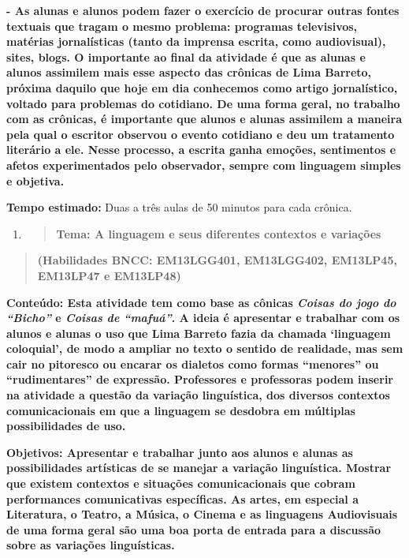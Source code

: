 \textbf{- As alunas e alunos podem fazer o exercício de procurar outras
fontes textuais que tragam o mesmo problema: programas televisivos,
matérias jornalísticas (tanto da imprensa escrita, como audiovisual),
sites, blogs. O importante ao final da atividade é que as alunas e
alunos assimilem mais esse aspecto das crônicas de Lima Barreto, próxima
daquilo que hoje em dia conhecemos como artigo jornalístico, voltado
para problemas do cotidiano. De uma forma geral, no trabalho com as
crônicas, é importante que alunos e alunas assimilem a maneira pela qual
o escritor observou o evento cotidiano e deu um tratamento literário a
ele. Nesse processo, a escrita ganha emoções, sentimentos e afetos
experimentados pelo observador, sempre com linguagem simples e objetiva.
}

\textbf{Tempo estimado:} Duas a três aulas de 50 minutos para cada
crônica.

\begin{enumerate}
\def\labelenumi{\arabic{enumi})}
\setcounter{enumi}{1}
\item
  \begin{quote}
  \textbf{Tema: A linguagem e seus diferentes contextos e variações}
  \end{quote}
\end{enumerate}

\begin{quote}
\textbf{(Habilidades BNCC: EM13LGG401, EM13LGG402, EM13LP45, EM13LP47 e
EM13LP48)}
\end{quote}

\textbf{Conteúdo: Esta atividade tem como base as cônicas \emph{Coisas
do jogo do ``Bicho''} e \emph{Coisas de ``mafuá''}. A ideia é apresentar
e trabalhar com os alunos e alunas o uso que Lima Barreto fazia da
chamada `linguagem coloquial', de modo a ampliar no texto o sentido de
realidade, mas sem cair no pitoresco ou encarar os dialetos como formas
``menores'' ou ``rudimentares'' de expressão. Professores e professoras
podem inserir na atividade a questão da variação linguística, dos
diversos contextos comunicacionais em que a linguagem se desdobra em
múltiplas possibilidades de uso. }

\textbf{Objetivos: Apresentar e trabalhar junto aos alunos e alunas as
possibilidades artísticas de se manejar a variação linguística. Mostrar
que existem contextos e situações comunicacionais que cobram
performances comunicativas específicas. As artes, em especial a
Literatura, o Teatro, a Música, o Cinema e as linguagens Audiovisuais de
uma forma geral são uma boa porta de entrada para a discussão sobre as
variações linguísticas. }

